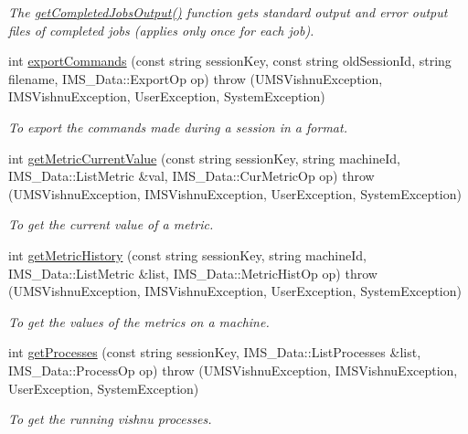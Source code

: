 \begin{DoxyCompactItemize}
\begin{DoxyCompactList}\small\item\em The \hyperlink{namespacevishnu_aaedc4b5676f0c8e47f333316cff0b0a8}{getCompletedJobsOutput()} function gets standard output and error output files of completed jobs (applies only once for each job). \item\end{DoxyCompactList}\item 
int \hyperlink{namespacevishnu_ac6b5cc01ba9509aa07b89dd69ada02fa}{exportCommands} (const string sessionKey, const string oldSessionId, string filename, IMS\_\-Data::ExportOp op)  throw (UMSVishnuException, IMSVishnuException, UserException, SystemException)
\begin{DoxyCompactList}\small\item\em To export the commands made during a session in a format. \item\end{DoxyCompactList}\item 
int \hyperlink{namespacevishnu_ad83c65006cee9dbbd73881089cc1f441}{getMetricCurrentValue} (const string sessionKey, string machineId, IMS\_\-Data::ListMetric \&val, IMS\_\-Data::CurMetricOp op)  throw (UMSVishnuException, IMSVishnuException, UserException, SystemException)
\begin{DoxyCompactList}\small\item\em To get the current value of a metric. \item\end{DoxyCompactList}\item 
int \hyperlink{namespacevishnu_aaec1e90bd62e865d63ed47dc7b2e7638}{getMetricHistory} (const string sessionKey, string machineId, IMS\_\-Data::ListMetric \&list, IMS\_\-Data::MetricHistOp op)  throw (UMSVishnuException, IMSVishnuException, UserException, SystemException)
\begin{DoxyCompactList}\small\item\em To get the values of the metrics on a machine. \item\end{DoxyCompactList}\item 
int \hyperlink{namespacevishnu_a9ab3615d929a06aa5e1feca1be9e49d9}{getProcesses} (const string sessionKey, IMS\_\-Data::ListProcesses \&list, IMS\_\-Data::ProcessOp op)  throw (UMSVishnuException, IMSVishnuException, UserException, SystemException)
\begin{DoxyCompactList}\small\item\em To get the running vishnu processes. \item\end{DoxyCompactList}\item 

\end{DoxyCompactItemize}
